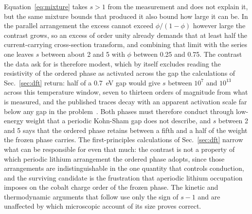 \documentclass[reprint,twocolumn,prb,amsmath,amssymb,superscriptaddress,floatfix]{revtex4-2}
\begin{document}
Equation~\eqref{eq:mixture} takes $s>1$ from the measurement and does not explain it, but the
same mixture bounds that produced it also bound how large it can be. In the parallel
arrangement the excess cannot exceed $\phi/(1-\phi)$ however large the contrast grows, so an
excess of order unity already demands that at least half the current-carrying cross-section
transform, and combining that limit with the series one leaves $s$ between about 2 and 5 with
$\phi$ between 0.25 and 0.75. The contrast the data ask for is therefore modest, which by itself
excludes reading the resistivity of the ordered phase as activated across the gap the
calculations of Sec.~\ref{sec:dft} return: half of a 0.7~eV gap would give $s$ between $10^{7}$
and $10^{13}$ across this temperature window, seven to thirteen orders of magnitude from what is
measured, and the published traces decay with an apparent activation scale far below any gap in
the problem~\cite{Crowley2020}. Both phases must therefore conduct through low-energy weight
that a periodic Kohn-Sham gap does not describe, and $s$ between 2 and 5 says that the ordered
phase retains between a fifth and a half of the weight the frozen phase carries. The
first-principles calculations of Sec.~\ref{sec:dft} narrow what can be responsible for even that
much: the contrast is not a property of which periodic lithium arrangement the ordered phase
adopts, since those arrangements are indistinguishable in the one quantity that controls
conduction, and the surviving candidate is the frustration that aperiodic lithium occupation
imposes on the cobalt charge order of the frozen phase. The kinetic and thermodynamic arguments
that follow use only the sign of $s-1$ and are unaffected by which microscopic account of its
size proves correct.
\end{document}
